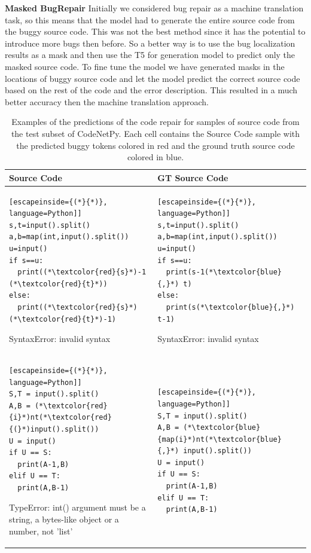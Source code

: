 \documentclass[12pt,a4paper]{report}
\begin{document}
\begin{appendices}
\textbf{Masked BugRepair} Initially we considered bug repair as a machine translation task, so this means that the model had to generate the entire source code from the buggy source code. This was not the best method since it has the potential to introduce more bugs then before. So a better way is to use the bug localization results as a mask and then use the T5 for generation model to predict only the masked source code.  To fine tune the model we have generated masks in the locations of buggy source code and let the model predict the correct source code based on the rest of the code and the error description. This resulted in a much better accuracy then the machine translation approach.

\begin{table}[H]\small\linespread{1}
\centering
\caption{Examples of the predictions of the code repair for samples of source code from the test subset of CodeNetPy. Each cell contains the Source Code sample with the predicted buggy tokens colored in red and the ground truth source code colored in blue.}
\label{tab:experiments15}
\begin{tabular}{p{7.5cm} p{7.5cm}}
\textbf{Source Code} & \textbf{GT Source Code} \\
\hline
\begin{lstlisting}[escapeinside={(*}{*)}, language=Python]]
s,t=input().split() 
a,b=map(int,input().split()) 
u=input() 
if s==u: 
  print((*\textcolor{red}{s}*)-1 (*\textcolor{red}{t}*)) 
else: 
  print((*\textcolor{red}{s}*) (*\textcolor{red}{t}*)-1)
\end{lstlisting}

SyntaxError: invalid syntax & 
\begin{lstlisting}[escapeinside={(*}{*)}, language=Python]]
s,t=input().split() 
a,b=map(int,input().split()) 
u=input() 
if s==u: 
  print(s-1(*\textcolor{blue}{,}*) t) 
else: 
  print(s(*\textcolor{blue}{,}*) t-1)
\end{lstlisting}

SyntaxError: invalid syntax
\\

\hline
\begin{lstlisting}[escapeinside={(*}{*)}, language=Python]]
S,T = input().split()
A,B = (*\textcolor{red}{i}*)nt(*\textcolor{red}{(}*)input().split())
U = input()
if U == S:
  print(A-1,B)
elif U == T:
  print(A,B-1)
\end{lstlisting}

TypeError: int() argument must be a string, a bytes-like object or a number, not 'list' & 
\begin{lstlisting}[escapeinside={(*}{*)}, language=Python]]
S,T = input().split()
A,B = (*\textcolor{blue}{map(i}*)nt(*\textcolor{blue}{,}*) input().split())
U = input()
if U == S:
  print(A-1,B)
elif U == T:
  print(A,B-1)
\end{lstlisting}


\end{tabular}
\end{table}
\end{appendices}
\end{document}
